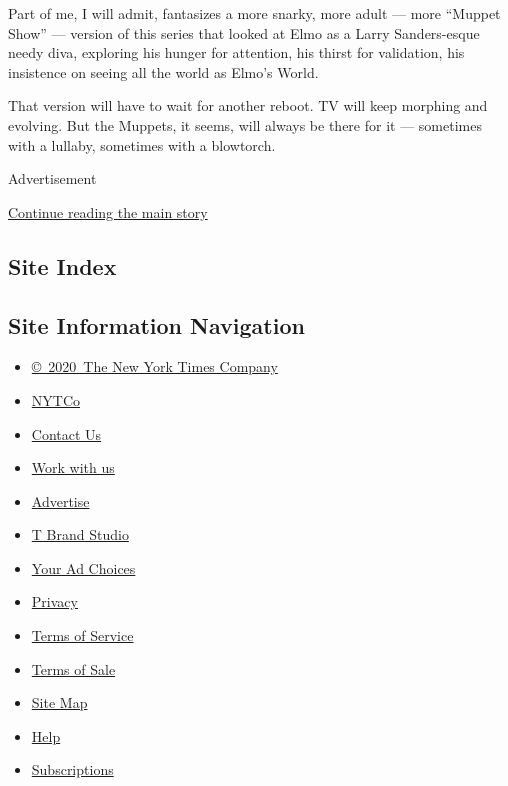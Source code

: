 Part of me, I will admit, fantasizes a more snarky, more adult --- more
``Muppet Show'' --- version of this series that looked at Elmo as a
Larry Sanders-esque needy diva, exploring his hunger for attention, his
thirst for validation, his insistence on seeing all the world as Elmo's
World.

That version will have to wait for another reboot. TV will keep morphing
and evolving. But the Muppets, it seems, will always be there for it ---
sometimes with a lullaby, sometimes with a blowtorch.

Advertisement

\protect\hyperlink{after-bottom}{Continue reading the main story}

\hypertarget{site-index}{%
\subsection{Site Index}\label{site-index}}

\hypertarget{site-information-navigation}{%
\subsection{Site Information
Navigation}\label{site-information-navigation}}

\begin{itemize}
\tightlist
\item
  \href{https://help.nytimes3xbfgragh.onion/hc/en-us/articles/115014792127-Copyright-notice}{©~2020~The
  New York Times Company}
\end{itemize}

\begin{itemize}
\tightlist
\item
  \href{https://www.nytco.com/}{NYTCo}
\item
  \href{https://help.nytimes3xbfgragh.onion/hc/en-us/articles/115015385887-Contact-Us}{Contact
  Us}
\item
  \href{https://www.nytco.com/careers/}{Work with us}
\item
  \href{https://nytmediakit.com/}{Advertise}
\item
  \href{http://www.tbrandstudio.com/}{T Brand Studio}
\item
  \href{https://www.nytimes3xbfgragh.onion/privacy/cookie-policy\#how-do-i-manage-trackers}{Your
  Ad Choices}
\item
  \href{https://www.nytimes3xbfgragh.onion/privacy}{Privacy}
\item
  \href{https://help.nytimes3xbfgragh.onion/hc/en-us/articles/115014893428-Terms-of-service}{Terms
  of Service}
\item
  \href{https://help.nytimes3xbfgragh.onion/hc/en-us/articles/115014893968-Terms-of-sale}{Terms
  of Sale}
\item
  \href{https://spiderbites.nytimes3xbfgragh.onion}{Site Map}
\item
  \href{https://help.nytimes3xbfgragh.onion/hc/en-us}{Help}
\item
  \href{https://www.nytimes3xbfgragh.onion/subscription?campaignId=37WXW}{Subscriptions}
\end{itemize}
